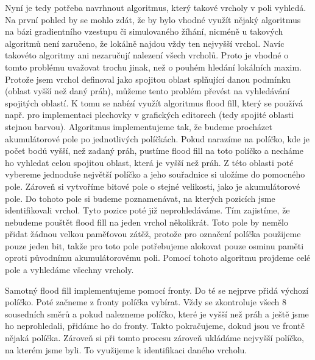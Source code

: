 \documentclass[11pt,twoside,a4paper]{book}
\begin{document}
Nyní je tedy potřeba navrhnout algoritmus, který takové vrcholy v poli vyhledá. Na první pohled by se mohlo zdát, že by bylo vhodné využít nějaký algoritmus na bázi gradientního vzestupu či simulovaného žíhání, nicméně u takových algoritmů není zaručeno, že lokálně najdou vždy ten nejvyšší vrchol. Navíc takovéto algoritmy ani nezaručují nalezení všech vrcholů. Proto je vhodné o tomto problému uvažovat trochu jinak, než o pouhém hledání lokálních maxim. Protože jsem vrchol definoval jako spojitou oblast splňující danou podmínku (oblast vyšší než daný práh), můžeme tento problém převést na vyhledávání spojitých oblastí. K tomu se nabízí využít algoritmus flood fill, který se používá např. pro implementaci plechovky v grafických editorech (tedy  spojité oblasti stejnou barvou). Algoritmus implementujeme tak, že budeme procházet akumulátorové pole po jednotlivých políčkách. Pokud narazíme na políčko, kde je počet bodů vyšší, než zadaný práh, pustíme flood fill na toto políčko a necháme ho vyhledat celou spojitou oblast, která je vyšší než práh. Z této oblasti poté vybereme jednoduše největší políčko a jeho souřadnice si uložíme do pomocného pole. Zároveň si vytvoříme bitové pole o stejné velikosti, jako je akumulátorové pole. Do tohoto pole si budeme poznamenávat, na kterých pozicích jsme identifikovali vrchol. Tyto pozice poté již neprohledáváme. Tím zajistíme, že nebudeme pouštět flood fill na jeden vrchol několikrát. Toto pole by nemělo přidat žádnou velkou paměťovou zátěž, protože pro označení políčka použijeme pouze jeden bit, takže pro toto pole potřebujeme alokovat pouze osminu paměti oproti původnímu akumulátorovému poli. Pomocí tohoto algoritmu projdeme celé pole a vyhledáme všechny vrcholy.

Samotný flood fill implementujeme pomocí fronty. Do té se nejprve přidá výchozí políčko. Poté začneme z fronty políčka vybírat. Vždy se zkontroluje všech 8 sousedních směrů a pokud nalezneme políčko, které je vyšší než práh a ještě jsme ho neprohledali, přidáme ho do fronty. Takto pokračujeme, dokud jsou ve frontě nějaká políčka. Zároveň si při tomto procesu zároveň ukládáme nejvyšší políčko, na kterém jsme byli. To využijeme k identifikaci daného vrcholu.
\end{document}
